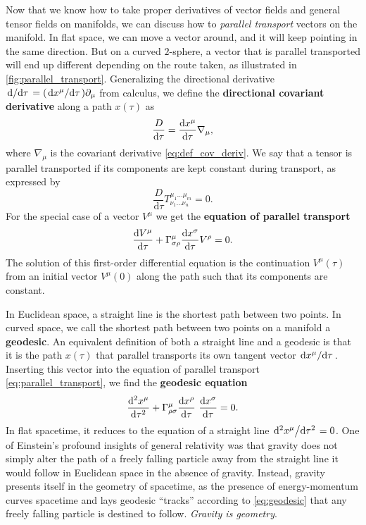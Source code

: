 Now that we know how to take proper derivatives of vector fields and general tensor fields on manifolds, we can discuss how to \emph{parallel transport} vectors on the manifold.
In flat space, we can move a vector around, and it will keep pointing in the same direction.
But on a curved $2$-sphere, a vector that is parallel transported will end up different depending on the route taken, as illustrated in \cref{fig:parallel_transport}.
Generalizing the directional derivative $\odv{}/{\tau} = (\odv{x^\mu}/{\tau}) \partial_\mu$ from calculus, we define the \textbf{directional covariant derivative} along a path $x(\tau)$ as
\begin{equation}
	\frac{D}{\mathrm{d} \tau} = \odv{x^\mu}{\tau} \nabla_\mu,
\end{equation}
where $\nabla_\mu$ is the covariant derivative \eqref{eq:def_cov_deriv}.
We say that a tensor is parallel transported if its components are kept constant during transport, as expressed by
\begin{equation}
	\frac{D}{\mathrm{d} \tau} T^{\mu_1 \ldots \mu_m}_{\nu_1 \ldots \nu_n} = 0 .
\end{equation}
For the special case of a vector $V^\mu$ we get the \textbf{equation of parallel transport}
\begin{equation}
	\odv{V^\mu}{\tau} + \Gamma^{\mu}_{\sigma \rho} \odv{x^\sigma}{\tau} V^\rho = 0 .
	\label{eq:parallel_transport}
\end{equation}
The solution of this first-order differential equation is the continuation $V^\mu(\tau)$ from an initial vector $V^\mu(0)$ along the path such that its components are constant.

In Euclidean space, a straight line is the shortest path between two points.
In curved space, we call the shortest path between two points on a manifold a \textbf{geodesic}.
An equivalent definition of both a straight line and a geodesic is that it is the path $x(\tau)$ that parallel transports its own tangent vector $\odv{x^\mu}/{\tau}$.
Inserting this vector into the equation of parallel transport \eqref{eq:parallel_transport}, we find the \textbf{geodesic equation}
\begin{equation}
	\odv[2]{x^\mu}{\tau} + \Gamma^\mu_{\rho \sigma} \odv{x^\rho}{\tau} \odv{x^\sigma}{\tau} = 0 .
	\label{eq:geodesic}
\end{equation}
In flat spacetime, it reduces to the equation of a straight line $\odv[2]{x^\mu}/{\tau} = 0$.
One of Einstein's profound insights of general relativity was that gravity does not simply alter the path of a freely falling particle away from the straight line it would follow in Euclidean space in the absence of gravity.
Instead, gravity presents itself in the geometry of spacetime, as the presence of energy-momentum curves spacetime and lays geodesic ``tracks'' according to \cref{eq:geodesic} that any freely falling particle is destined to follow.
\emph{Gravity is geometry}.

